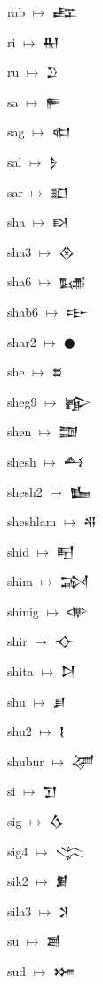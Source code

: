 {\noindent rab $\mapsto$ {\cufont 𒊐}\par
\noindent ri $\mapsto$ {\cufont 𒊑}\par
\noindent ru $\mapsto$ {\cufont 𒊒}\par
\noindent sa $\mapsto$ {\cufont 𒊓}\par
\noindent sag $\mapsto$ {\cufont 𒊕}\par
\noindent sal $\mapsto$ {\cufont 𒊩}\par
\noindent sar $\mapsto$ {\cufont 𒊬}\par
\noindent sha $\mapsto$ {\cufont 𒊭}\par
\noindent sha3 $\mapsto$ {\cufont 𒊮}\par
\noindent sha6 $\mapsto$ {\cufont 𒊷}\par
\noindent shab6 $\mapsto$ {\cufont 𒊸}\par
\noindent shar2 $\mapsto$ {\cufont 𒊹}\par
\noindent she $\mapsto$ {\cufont 𒊺}\par
\noindent sheg9 $\mapsto$ {\cufont 𒊾}\par
\noindent shen $\mapsto$ {\cufont 𒊿}\par
\noindent shesh $\mapsto$ {\cufont 𒋀}\par
\noindent shesh2 $\mapsto$ {\cufont 𒋁}\par
\noindent sheshlam $\mapsto$ {\cufont 𒋂}\par
\noindent shid $\mapsto$ {\cufont 𒋃}\par
\noindent shim $\mapsto$ {\cufont 𒋆}\par
\noindent shinig $\mapsto$ {\cufont 𒋒}\par
\noindent shir $\mapsto$ {\cufont 𒋓}\par
\noindent shita $\mapsto$ {\cufont 𒋖}\par
\noindent shu $\mapsto$ {\cufont 𒋗}\par
\noindent shu2 $\mapsto$ {\cufont 𒋙}\par
\noindent shubur $\mapsto$ {\cufont 𒋚}\par
\noindent si $\mapsto$ {\cufont 𒋛}\par
\noindent sig $\mapsto$ {\cufont 𒋝}\par
\noindent sig4 $\mapsto$ {\cufont 𒋞}\par
\noindent sik2 $\mapsto$ {\cufont 𒋠}\par
\noindent sila3 $\mapsto$ {\cufont 𒋡}\par
\noindent su $\mapsto$ {\cufont 𒋢}\par
\noindent sud $\mapsto$ {\cufont 𒋤}\par
}
